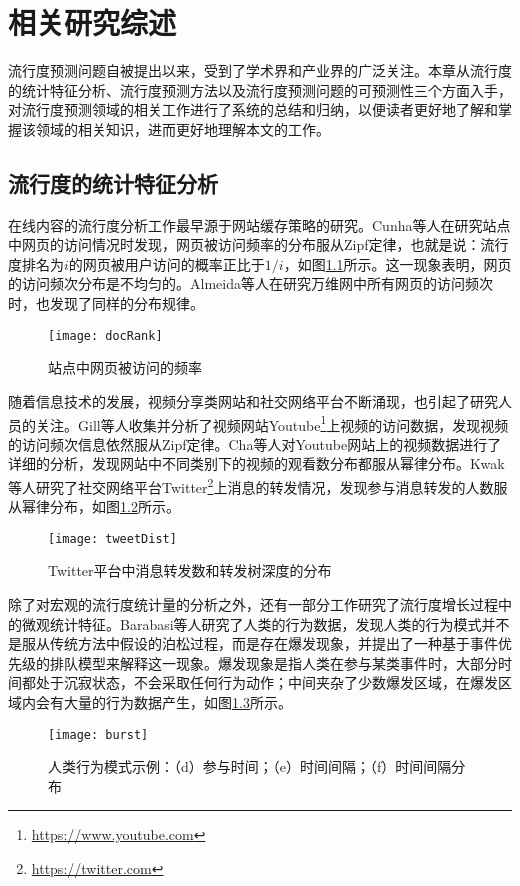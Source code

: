
\chapter{相关研究综述}
\label{chap:relatedwork}
流行度预测问题自被提出以来，受到了学术界和产业界的广泛关注。本章从流行度的统计特征分析、流行度预测方法以及流行度预测问题的可预测性三个方面入手，对流行度预测领域的相关工作进行了系统的总结和归纳，以便读者更好地了解和掌握该领域的相关知识，进而更好地理解本文的工作。

\section{流行度的统计特征分析}
在线内容的流行度分析工作最早源于网站缓存策略的研究。Cunha等人\citep{cunha1995characteristics}在研究站点中网页的访问情况时发现，网页被访问频率的分布服从Zipf定律\citep{zipf2016human}，也就是说：流行度排名为$i$的网页被用户访问的概率正比于$1/i$，如图\ref{fig:pageDist}所示。这一现象表明，网页的访问频次分布是不均匀的。Almeida等人\citep{almeida1996characterizing}在研究万维网中所有网页的访问频次时，也发现了同样的分布规律。
\begin{figure}[!htbp]
  \centering
  \texttt{[image: docRank]}
  \caption{站点中网页被访问的频率\citep{cunha1995characteristics}}
  \label{fig:pageDist}
\end{figure}

随着信息技术的发展，视频分享类网站和社交网络平台不断涌现，也引起了研究人员的关注。Gill等人\citep{gill2007youtube}收集并分析了视频网站Youtube\footnote{\url{https://www.youtube.com}}上视频的访问数据，发现视频的访问频次信息依然服从Zipf定律。Cha等人\citep{cha2009analyzing}对Youtube网站上的视频数据进行了详细的分析，发现网站中不同类别下的视频的观看数分布都服从幂律分布。Kwak等人\citep{kwak2010twitter}研究了社交网络平台Twitter\footnote{\url{https://twitter.com}}上消息的转发情况，发现参与消息转发的人数服从幂律分布，如图\ref{fig:tweetDist}所示。
\begin{figure}[!htbp]
  \centering
  \texttt{[image: tweetDist]}
  \caption{Twitter平台中消息转发数和转发树深度的分布\citep{kwak2010twitter}}
  \label{fig:tweetDist}
\end{figure}

除了对宏观的流行度统计量的分析之外，还有一部分工作研究了流行度增长过程中的微观统计特征。Barabasi等人\citep{barabasi05}研究了人类的行为数据，发现人类的行为模式并不是服从传统方法中假设的泊松过程，而是存在爆发现象，并提出了一种基于事件优先级的排队模型来解释这一现象。爆发现象是指人类在参与某类事件时，大部分时间都处于沉寂状态，不会采取任何行为动作；中间夹杂了少数爆发区域，在爆发区域内会有大量的行为数据产生，如图\ref{fig:burst}所示。
\begin{figure}[!htbp]
  \centering
  \texttt{[image: burst]}
  \caption{人类行为模式示例\citep{barabasi05}：（d）参与时间；（e）时间间隔；（f）时间间隔分布}
  \label{fig:burst}
\end{figure}

